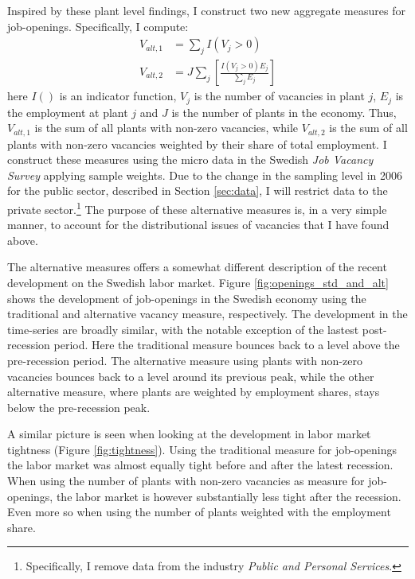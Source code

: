 Inspired by these plant level findings, I construct two new aggregate measures for job-openings. Specifically, I compute:
\begin{align}
V_{alt,1}&=\sum_{j} I \left( V_j >0 \right) \label{eq:V_alt1} \\
V_{alt,2}&=J\sum_{j} \left [  \frac{ I \left( V_j >0 \right) E_j}{\sum_j E_j} \right] \label{eq:V_alt2} 
\end{align}
here $I()$ is an indicator function, $V_j$ is the number of vacancies in plant $j$, $E_j$ is the employment at plant $j$ and $J$ is the number of plants in the economy. Thus, $V_{alt,1}$ is the sum of all plants with non-zero vacancies, while $V_{alt,2}$ is the sum of all plants with non-zero vacancies weighted by their share of total employment. I construct these measures using the micro data in the Swedish \emph{Job Vacancy Survey} applying sample weights. Due to the change in the sampling level in 2006 for the public sector, described in Section \ref{sec:data}, I will restrict data to the private sector.\footnote{Specifically, I remove data from the industry \emph{Public and Personal Services}.} The purpose of these alternative measures is, in a very simple manner, to account for the distributional issues of vacancies that I have found above.

The alternative measures offers a somewhat different description of the recent development on the Swedish labor market. Figure \ref{fig:openings_std_and_alt} shows the development of job-openings in the Swedish economy using the traditional and alternative vacancy measure, respectively. The development in the time-series are broadly similar, with the notable exception of the lastest post-recession period. Here the traditional measure bounces back to a level above the pre-recession period. The alternative measure using plants with non-zero vacancies bounces back to a level around its previous peak, while the other alternative measure, where plants are weighted by employment shares, stays below the pre-recession peak. 

A similar picture is seen when looking at the development in labor market tightness (Figure \ref{fig:tightness}). Using the traditional measure for job-openings the labor market was almost equally tight before and after the latest recession. When using the number of plants with non-zero vacancies as measure for job-openings, the labor market is however substantially less tight after the recession. Even more so when using the number of plants weighted with the employment share. 

